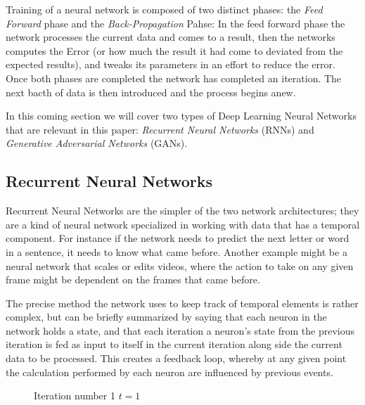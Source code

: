 Training of a neural network is composed of two distinct phases: the \emph{Feed Forward} phase and the \emph{Back-Propagation} Pahse: In the feed forward phase the network processes the current data and comes to a result, then the networks computes the Error (or how much the result it had come to deviated from the expected results), and tweaks its parameters in an effort to reduce the error.
Once both phases are completed the network has completed an iteration. The next bacth of data is then introduced and the process begins anew.

In this coming section we will cover two types of Deep Learning Neural Networks that are relevant in this paper: \emph{Recurrent Neural Networks} (RNNs) and  \emph{Generative Adversarial Networks} (GANs).
\clearpage

\subsection{Recurrent Neural Networks}
Recurrent Neural Networks are the simpler of the two network architectures; they are a kind of neural network specialized in working with data that has a temporal component.
For instance if the network needs to predict the next letter or word in a sentence, it needs to know what came before. Another example might be a neural network that scales or edits videos, where the action to take on any given frame might be dependent on the frames that came before.

The precise method the network uses to keep track of temporal elements is rather complex, but can be briefly summarized by saying that each neuron in the network holds a state, and that each iteration a neuron's state from the previous iteration is fed as input to itself in the current iteration along side the current data to be processed.
This creates a feedback loop, whereby at any given point the calculation performed by each neuron are influenced by previous events.

\begin{figure}[H]    
\centering
{}
\begin{center}
Iteration number 1 $t=1$
\end{center}
\end{figure}


